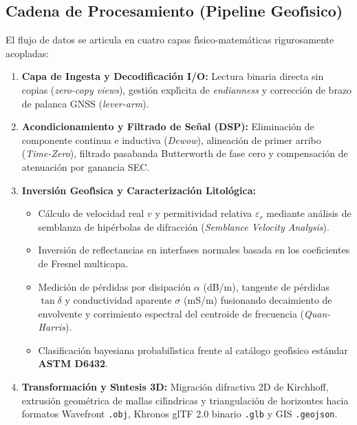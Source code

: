 \documentclass[11pt,a4paper]{article}
\begin{document}
\subsection{Cadena de Procesamiento (Pipeline Geof{\'\i}sico)}
El flujo de datos se articula en cuatro capas f{\'\i}sico-matem{\'a}ticas rigurosamente acopladas:
\begin{enumerate}
    \item \textbf{Capa de Ingesta y Decodificaci{\'o}n I/O:} Lectura binaria directa sin copias (\textit{zero-copy views}), gesti{\'o}n expl{\'\i}cita de \textit{endianness} y correcci{\'o}n de brazo de palanca GNSS (\textit{lever-arm}).
    \item \textbf{Acondicionamiento y Filtrado de Se{\~n}al (DSP):} Eliminaci{\'o}n de componente continua e inductiva (\textit{Dewow}), alineaci{\'o}n de primer arribo (\textit{Time-Zero}), filtrado pasabanda Butterworth de fase cero y compensaci{\'o}n de atenuaci{\'o}n por ganancia SEC.
    \item \textbf{Inversi{\'o}n Geof{\'\i}sica y Caracterizaci{\'o}n Litol{\'o}gica:}
    \begin{itemize}
        \item C{\'a}lculo de velocidad real $v$ y permitividad relativa $\varepsilon_r$ mediante an{\'a}lisis de semblanza de hip{\'e}rbolas de difracci{\'o}n (\textit{Semblance Velocity Analysis}).
        \item Inversi{\'o}n de reflectancias en interfases normales basada en los coeficientes de Fresnel multicapa.
        \item Medici{\'o}n de p{\'e}rdidas por disipaci{\'o}n $\alpha$ (dB/m), tangente de p{\'e}rdidas $\tan\delta$ y conductividad aparente $\sigma$ (mS/m) fusionando decaimiento de envolvente y corrimiento espectral del centroide de frecuencia (\textit{Quan-Harris}).
        \item Clasificaci{\'o}n bayesiana probabil{\'\i}stica frente al cat{\'a}logo geof{\'\i}sico est{\'a}ndar \textbf{ASTM D6432}.
    \end{itemize}
    \item \textbf{Transformaci{\'o}n y S{\'\i}ntesis 3D:} Migraci{\'o}n difractiva 2D de Kirchhoff, extrusi{\'o}n geom{\'e}trica de mallas cil{\'\i}ndricas y triangulaci{\'o}n de horizontes hacia formatos Wavefront \texttt{.obj}, Khronos glTF 2.0 binario \texttt{.glb} y GIS \texttt{.geojson}.
\end{enumerate}

\end{document}
